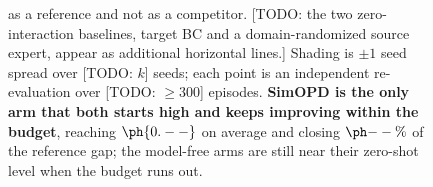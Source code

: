 \begin{figure}[t]
{  as a reference and not as a competitor. [TODO: the two zero-interaction
  baselines, target BC and a domain-randomized source expert, appear as
  additional horizontal lines.] Shading is $\pm 1$ seed spread over [TODO: $k$]
  seeds; each point is an independent re-evaluation over [TODO: $\ge 300$]
  episodes.
  \textbf{SimOPD is the only arm that both starts high and keeps improving
  within the budget}, reaching $\ph{0.--}$ on average and closing $\ph{--\%}$
  of the reference gap; the model-free arms are still near their zero-shot level
  when the budget runs out.
}
\label{fig:main-sim2sim}
\end{figure}


